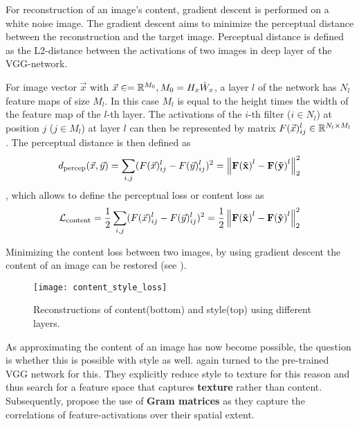 For reconstruction of an image's content, gradient descent is performed on a white noise image.
The gradient descent aims to minimize the perceptual distance between the reconstruction and the target image.
Perceptual distance is defined as the L2-distance between the activations of two images in deep layer of the VGG-network.

For image vector $\vec{x}$ with $\vec{x} \in = \mathbb{R}^{M_0}, M_0 = H_x \dot W_x $, a layer $l$ of the network has $N_l$ feature maps of size $M_l$.
In this case $M_l$ is equal to the height times the width of the feature map of the $l$-th layer.
The activations of the $i$-th filter ($i \in N_l$) at position $j$ ($j \in M_l$) at layer $l$ can then be represented by matrix $F(\vec{x})_{ij}^l \in \mathbb{R}^{N_l \times M_l}$.
The perceptual distance is then defined as
\begin{align}
    d_{\text{percep}}(\vec{x}, \vec{y}) = \sum_{i, j} (F(\vec{x})_{ij}^l - F(\vec{y})_{ij}^l)^2 = \left\lVert\mathbf{F(\vec{x})}^l - \mathbf{F(\vec{y})}^l\right\rVert_2^2
\end{align}
, which allows to define the perceptual loss or content loss as 
\begin{align}
    \mathcal{L}_{\text{content}} = \frac{1}{2} \sum_{i, j} (F(\vec{x})_{ij}^l - F(\vec{y})_{ij}^l)^2 = \frac{1}{2} \left\lVert\mathbf{F(\vec{x})}^l - \mathbf{F(\vec{y})}^l\right\rVert_2^2
\end{align}


Minimizing the content loss between two images, by using gradient descent the content of an image can be restored (see ).

\begin{figure*}
    \texttt{[image: content\_style\_loss]}
    \caption[]{Reconstructions of content(bottom) and style(top) using different layers. \cite{gatys}}
\end{figure*}

As approximating the content of an image has now become possible, the question is whether this is possible with style as well.
\citeauthor*{gatys} again turned to the pre-trained VGG network for this.
They explicitly reduce style to texture for this reason and thus search for a feature space that captures \textbf{texture} rather than content.
Subsequently, \citeauthor*{gatys} propose the use of \textbf{Gram matrices} as they capture the correlations of feature-activations over their spatial extent.

